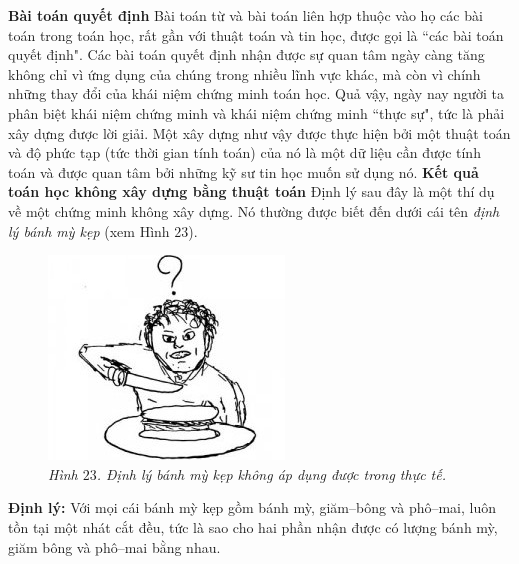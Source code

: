 \begin{multicols}{2}
	\vskip 0.1cm
	\textbf{\color{duongvaotoanhoc}Bài toán quyết định}
	\vskip 0.1cm
	Bài toán từ và bài toán liên hợp thuộc vào họ các bài toán trong toán học, rất gần với thuật toán và tin học, được gọi là ``các bài toán quyết định". Các bài toán quyết định nhận được sự quan tâm ngày càng tăng không chỉ vì ứng dụng của chúng trong nhiều lĩnh vực khác, mà còn vì chính những thay đổi của khái niệm chứng minh toán học. Quả vậy, ngày nay người ta phân biệt khái niệm chứng minh và khái niệm chứng minh ``thực sự", tức là phải xây dựng được lời giải. Một xây dựng như vậy được thực hiện bởi một thuật toán và độ phức tạp (tức thời gian tính toán) của nó là một dữ liệu cần được tính toán và được quan tâm bởi những kỹ sư tin học muốn sử dụng nó.
	\vskip 0.1cm
	\textbf{\color{duongvaotoanhoc}Kết quả toán học không xây dựng bằng thuật toán}
	\vskip 0.1cm
	Định lý sau đây là một thí dụ về một chứng minh không xây dựng. Nó thường được biết đến dưới cái tên \textit{định lý bánh mỳ kẹp} (xem Hình $23$).
	\begin{figure}[H]
		\vspace*{-5pt}
		\centering
		\captionsetup{labelformat= empty, justification=centering}
		\includegraphics[width= 0.9\linewidth]{fig_23}
		\caption{\small\textit{\color{duongvaotoanhoc}Hình $23$. Định lý bánh mỳ kẹp không áp dụng được trong thực tế.}}
		\vspace*{-5pt}
	\end{figure}
	\textbf{\color{duongvaotoanhoc}Định lý:} Với mọi cái bánh mỳ kẹp gồm bánh mỳ, giăm--bông và phô--mai, luôn tồn tại một nhát cắt đều, tức là sao cho hai phần nhận được có lượng bánh mỳ, giăm bông và phô--mai bằng nhau.

\end{multicols}

